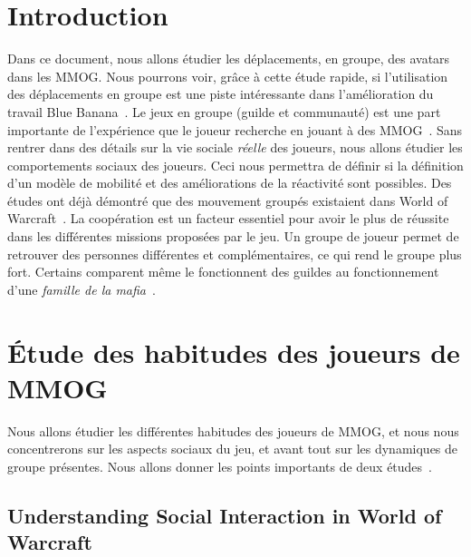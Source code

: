 \documentclass[11pt,a4paper]{article}
\begin{document}

\newpage
\tableofcontents
\newpage



\section{Introduction}
Dans ce document, nous allons étudier les déplacements, en groupe, des avatars dans les MMOG. Nous pourrons voir, grâce à cette étude rapide, si l'utilisation des déplacements en groupe est une piste intéressante dans l'amélioration du travail Blue Banana~\cite{191}. Le jeux en groupe (guilde et communauté) est une part importante de l'expérience que le joueur recherche en jouant à des MMOG~\cite{1501834,1255052}. Sans rentrer dans des détails sur la vie sociale \textit{réelle} des joueurs, nous allons étudier les comportements sociaux des joueurs. Ceci nous permettra de définir si la définition d'un modèle de mobilité et des améliorations de la réactivité sont possibles. Des études ont déjà démontré que des mouvement groupés existaient dans World of Warcraft~\cite{15141312}. La coopération est un facteur essentiel pour avoir le plus de réussite  dans les différentes missions proposées par le jeu. Un groupe de joueur permet de retrouver des personnes différentes et complémentaires, ce qui rend le groupe plus fort. Certains comparent même le fonctionnent des guildes au fonctionnement d'une \textit{famille de la mafia}~\cite{Jakobsson03thesopranos}.


\section{Étude des habitudes des joueurs de MMOG}
Nous allons étudier les différentes habitudes des joueurs de MMOG, et nous nous concentrerons sur les aspects sociaux du jeu, et avant tout sur les dynamiques de groupe présentes. Nous allons donner les points importants de deux études~\cite{1255052,StudyEQ}.

\subsection{Understanding Social Interaction in World of Warcraft}
\end{document}
